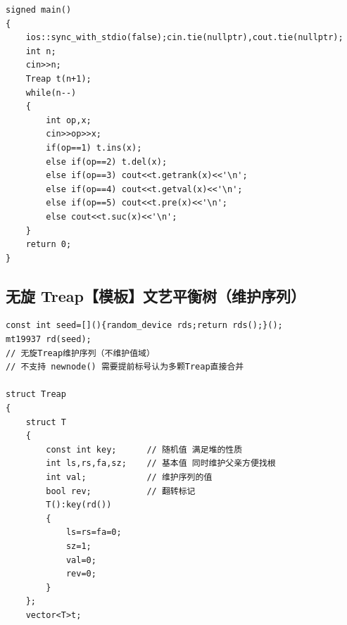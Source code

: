 \begin{verbatim}
signed main()
{
    ios::sync_with_stdio(false);cin.tie(nullptr),cout.tie(nullptr);
    int n;
    cin>>n;
    Treap t(n+1);
    while(n--)
    {
        int op,x;
        cin>>op>>x;
        if(op==1) t.ins(x);
        else if(op==2) t.del(x);
        else if(op==3) cout<<t.getrank(x)<<'\n';
        else if(op==4) cout<<t.getval(x)<<'\n';
        else if(op==5) cout<<t.pre(x)<<'\n';
        else cout<<t.suc(x)<<'\n';
    }
    return 0;
}
\end{verbatim}

\subsection{无旋 Treap【模板】文艺平衡树（维护序列）}
\begin{verbatim}
const int seed=[](){random_device rds;return rds();}();
mt19937 rd(seed);
// 无旋Treap维护序列（不维护值域）
// 不支持 newnode() 需要提前标号认为多颗Treap直接合并

struct Treap
{
    struct T
    {
        const int key;      // 随机值 满足堆的性质
        int ls,rs,fa,sz;    // 基本值 同时维护父亲方便找根
        int val;            // 维护序列的值
        bool rev;           // 翻转标记
        T():key(rd())
        {
            ls=rs=fa=0;
            sz=1;
            val=0;
            rev=0;
        }
    };
    vector<T>t;
    

\end{verbatim}

